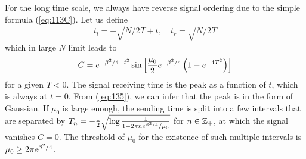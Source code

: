 \documentclass[11pt]{article}
\renewcommand{\>}{\rangle}
\newcommand{\<}{\langle}
\begin{document}
For the long time scale, we always have reverse signal ordering due
to the simple formula (\ref{eq:113C}). Let us define
\begin{equation}
t_{l}=-\sqrt{N/2}T+t,\quad t_{r}=\sqrt{N/2}T
\end{equation}
which in large $N$ limit leads to
\begin{equation}
C=e^{-\beta^{2}/4-t^{2}}\sin\left[\frac{\mu_{0}}{2}e^{-\beta^{2}/4}\left(1-e^{-4T^{2}}\right)\right]\label{eq:135}
\end{equation}
for a given $T<0$. The signal receiving time is the peak as a function
of $t$, which is always at $t=0$. From (\ref{eq:135}), we can infer
that the peak is in the form of Gaussian. If $\mu_{0}$ is large enough,
the sending time is split into a few intervals that are separated
by $T_{n}=-\frac{1}{2}\sqrt{\log\frac{1}{1-2\pi ne^{\beta^{2}/4}/\mu_{0}}}$ for
$n\in\mathbb{Z}_{+}$, at which the signal vanishes $C=0$. The threshold
of $\mu_{0}$ for the existence of such multiple intervals is $\mu_{0}\geq2\pi e^{\beta^{2}/4}$.
\end{document}
